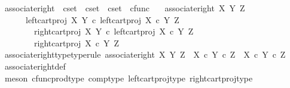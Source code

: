 \begin{isabellebody}
%
\endisatagdocument
{\isafolddocument}%
%
\isadelimdocument
%
\endisadelimdocument
{}\isamarkupfalse%
\ associate{\isacharunderscore}{\kern0pt}right\ {\isacharcolon}{\kern0pt}{\isacharcolon}{\kern0pt}\ {\isachardoublequoteopen}cset\ {\isasymRightarrow}\ cset\ {\isasymRightarrow}\ cset\ {\isasymRightarrow}\ cfunc{\isachardoublequoteclose}\ \isanewline
\ \ {\isachardoublequoteopen}associate{\isacharunderscore}{\kern0pt}right\ X\ Y\ Z\ {\isacharequal}{\kern0pt}\isanewline
\ \ \ \ {\isasymlangle}\isanewline
\ \ \ \ \ \ left{\isacharunderscore}{\kern0pt}cart{\isacharunderscore}{\kern0pt}proj\ X\ Y\ {\isasymcirc}\isactrlsub c\ left{\isacharunderscore}{\kern0pt}cart{\isacharunderscore}{\kern0pt}proj\ {\isacharparenleft}{\kern0pt}X\ {\isasymtimes}\isactrlsub c\ Y{\isacharparenright}{\kern0pt}\ Z{\isacharcomma}{\kern0pt}\ \isanewline
\ \ \ \ \ \ {\isasymlangle}\isanewline
\ \ \ \ \ \ \ \ right{\isacharunderscore}{\kern0pt}cart{\isacharunderscore}{\kern0pt}proj\ X\ Y\ {\isasymcirc}\isactrlsub c\ left{\isacharunderscore}{\kern0pt}cart{\isacharunderscore}{\kern0pt}proj\ {\isacharparenleft}{\kern0pt}X\ {\isasymtimes}\isactrlsub c\ Y{\isacharparenright}{\kern0pt}\ Z{\isacharcomma}{\kern0pt}\isanewline
\ \ \ \ \ \ \ \ right{\isacharunderscore}{\kern0pt}cart{\isacharunderscore}{\kern0pt}proj\ {\isacharparenleft}{\kern0pt}X\ {\isasymtimes}\isactrlsub c\ Y{\isacharparenright}{\kern0pt}\ Z\isanewline
\ \ \ \ \ \ {\isasymrangle}\isanewline
\ \ \ \ {\isasymrangle}{\isachardoublequoteclose}\isanewline
\isanewline
{}\isamarkupfalse%
\ associate{\isacharunderscore}{\kern0pt}right{\isacharunderscore}{\kern0pt}type{\isacharbrackleft}{\kern0pt}type{\isacharunderscore}{\kern0pt}rule{\isacharbrackright}{\kern0pt}{\isacharcolon}{\kern0pt}\ {\isachardoublequoteopen}associate{\isacharunderscore}{\kern0pt}right\ X\ Y\ Z\ {\isacharcolon}{\kern0pt}\ {\isacharparenleft}{\kern0pt}X\ {\isasymtimes}\isactrlsub c\ Y{\isacharparenright}{\kern0pt}\ {\isasymtimes}\isactrlsub c\ Z\ {\isasymrightarrow}\ X\ {\isasymtimes}\isactrlsub c\ {\isacharparenleft}{\kern0pt}Y\ {\isasymtimes}\isactrlsub c\ Z{\isacharparenright}{\kern0pt}{\isachardoublequoteclose}\isanewline
%
\isadelimproof
\ \ %
\endisadelimproof
%
\isatagproof
{}\isamarkupfalse%
\ associate{\isacharunderscore}{\kern0pt}right{\isacharunderscore}{\kern0pt}def\ \isamarkupfalse%
\ {\isacharparenleft}{\kern0pt}meson\ cfunc{\isacharunderscore}{\kern0pt}prod{\isacharunderscore}{\kern0pt}type\ comp{\isacharunderscore}{\kern0pt}type\ left{\isacharunderscore}{\kern0pt}cart{\isacharunderscore}{\kern0pt}proj{\isacharunderscore}{\kern0pt}type\ right{\isacharunderscore}{\kern0pt}cart{\isacharunderscore}{\kern0pt}proj{\isacharunderscore}{\kern0pt}type{\isacharparenright}{\kern0pt}%

\end{isabellebody}
